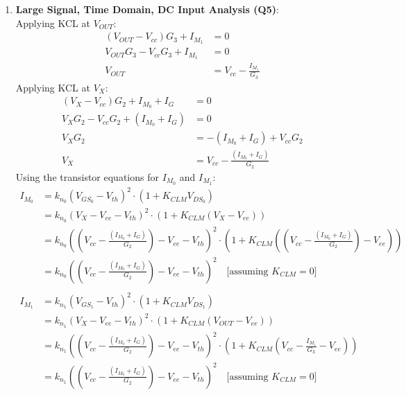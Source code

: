 \begin{enumerate}
  \item \textbf{Large Signal, Time Domain, DC Input Analysis (Q5)}:\\
    Applying KCL at $V_{OUT}$:
    \begin{align*}
      (V_{OUT} - V_{cc})G_3 + I_{M_1} &= 0 \\
      V_{OUT}G_3 - V_{cc}G_3 + I_{M_1} &= 0 \\
      V_{OUT} &= V_{cc} - \frac{I_{M_1}}{G_3} \tag{1}\end{align*}
    Applying KCL at $V_{X}$:
    \begin{align*}
      (V_{X} - V_{cc})G_2 + I_{M_0} + I_{G} &= 0 \\
      V_{X}G_2 - V_{cc}G_2 + (I_{M_0} + I_{G}) &= 0 \\
      V_{X}G_2 &= - (I_{M_0} + I_{G}) + V_{cc}G_2 \\
      V_{X} &= V_{cc} - \frac{(I_{M_0} + I_{G})}{G_2} \tag{2}
    \end{align*}
    Using the transistor equations for $I_{M_0}$ and
    $I_{M_1}$:
    \begin{align*}
      I_{M_0} &= k_{n_0}(V_{GS_0} - V_{th})^2 \cdot (1 + K_{CLM} V_{DS_0}) \\
              &= k_{n_0}(V_{X} - V_{ee} - V_{th})^2 \cdot (1 + K_{CLM} (V_{X} - V_{ee})) \\
              &= k_{n_0}\left(\left(V_{cc} - \frac{(I_{M_0} + I_{G})}{G_2}\right) - V_{ee} - V_{th}\right)^2 \cdot \left(1 + K_{CLM} \left(\left(V_{cc} - \frac{(I_{M_0} + I_{G})}{G_2}\right) - V_{ee}\right)\right) \\
              &= k_{n_0}\left(\left(V_{cc} - \frac{(I_{M_0} + I_{G})}{G_2}\right) - V_{ee} - V_{th}\right)^2 \quad \text{[assuming } K_{CLM} = 0 \text{]} \tag{3} \\ \\
      I_{M_1} &= k_{n_1}(V_{GS_1} - V_{th})^2 \cdot (1 + K_{CLM} V_{DS_1}) \\
              &= k_{n_1}(V_{X} - V_{ee} - V_{th})^2 \cdot (1 + K_{CLM} (V_{OUT} - V_{ee})) \\
              &= k_{n_1}\left(\left(V_{cc} - \frac{(I_{M_0} + I_{G})}{G_2}\right) - V_{ee} - V_{th}\right)^2 \cdot \left(1 + K_{CLM} \left(V_{cc} - \frac{I_{M_1}}{G_3} - V_{ee}\right)\right) \\
              &= k_{n_1}\left(\left(V_{cc} - \frac{(I_{M_0} + I_{G})}{G_2}\right) - V_{ee} - V_{th}\right)^2 \quad \text{[assuming } K_{CLM} = 0 \text{]} \tag{4}
    \end{align*}

\end{enumerate}
